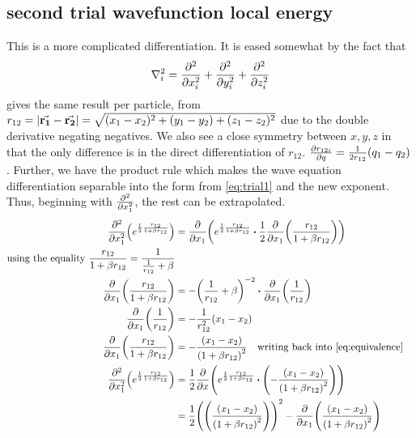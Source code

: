 \documentclass[10pt]{revtex4-1}
\begin{document}
\subsection{second trial wavefunction local energy}
This is a more complicated differentiation. It is eased somewhat by the fact that
\[ \nabla_i^2 = \pdv[2]{x_i} + \pdv[2]{y_i} + \pdv[2]{z_i} \]
gives the same result per particle, from $r_{12} = \qty| \va{r_1} - \va{r_2} | = \sqrt{ (x_1 - x_2)^2 + (y_1 - y_2) + (z_1 - z_2)^2 }$ due to the
double derivative negating negatives. We also see a close symmetry between $x, y, z$ in that the only difference is in the direct differentiation of
$r_{12}$. $\pdv{r_{12i}}{q} = \frac{1}{2r_{12}}(q_1 - q_2)$. Further, we have the product rule which makes the wave equation differentiation separable into
the form from \ref{eq:trial1} and the new exponent. Thus, beginning with $\pdv[2]{x_1}$, the rest can be extrapolated.
\begin{align}
    \pdv[2]{x_1} \qty( e^{\frac{1}{2}\frac{r_{12}}{1 + \beta r_{12}}})
        &= \pdv{x_1} \qty( e^{\frac{1}{2} \frac{r_{12}}{1 + \beta r_{12}}} \vdot \frac{1}{2}\pdv{x_1}\qty( \frac{r_{12}}{1 + \beta r_{12}} ) )\nonumber \\
    \text{using the equality } \frac{r_{12}}{1 + \beta r_{12} } = \frac{1}{\frac{1}{r_{12}} + \beta } \label{eq:equivalence} \\
    \pdv{x_1} \qty( \frac{r_{12}}{1 + \beta r_{12}} )
        &= -\qty( \frac{1}{r_{12}} + \beta )^{-2} \vdot \pdv{x_1} \qty( \frac{1}{r_{12}} ) \nonumber\\
    \pdv{x_1}\qty( \frac{1}{r_{12}} ) &= -\frac{1}{r_{12}^2}(x_1 - x_2)\nonumber \\
    \pdv{x_1} \qty( \frac{r_{12}}{1 + \beta r_{12}} )
        &= - \frac{(x_1 - x_2)}{\qty( 1 + \beta r_{12} )^2} \qq{writing back into \ref{eq:equivalence}} \nonumber \\
    \pdv[2]{x_1} \qty( e^{\frac{1}{2}\frac{r_{12}}{1 + \beta r_{12}}})
        &= \frac{1}{2} \pdv{x} \qty( e^{\frac{1}{2} \frac{r_{12}}{1 + \beta r_{12}}} \vdot \qty( - \frac{(x_1 - x_2)}{\qty( 1 + \beta r_{12} )^2} ) ) \nonumber\\
        &= \frac{1}{2} \qty( \qty(\frac{(x_1 - x_2)}{\qty( 1 + \beta r_{12} )^2}))^2 - \pdv{x_1} \qty( \frac{(x_1 - x_2)}{\qty( 1 + \beta r_{12} )^2} )
\end{align}
\end{document}
